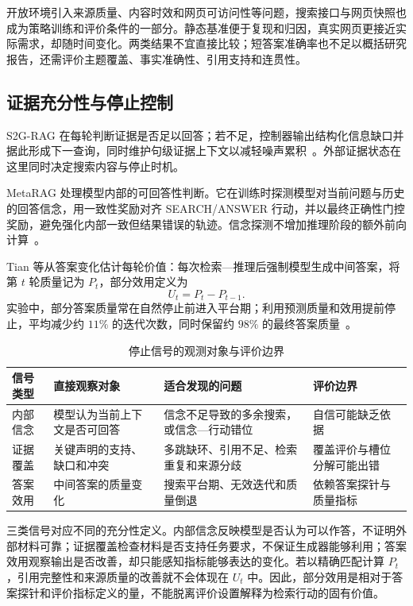 开放环境引入来源质量、内容时效和网页可访问性等问题，搜索接口与网页快照也成为策略训练和评价条件的一部分。静态基准便于复现和归因，真实网页更接近实际需求，却随时间变化。两类结果不宜直接比较；短答案准确率也不足以概括研究报告，还需评价主题覆盖、事实准确性、引用支持和连贯性。

\subsection{证据充分性与停止控制}

S2G-RAG 在每轮判断证据是否足以回答；若不足，控制器输出结构化信息缺口并据此形成下一查询，同时维护句级证据上下文以减轻噪声累积~\citep{li2026s2g}。外部证据状态在这里同时决定搜索内容与停止时机。

MetaRAG 处理模型内部的可回答性判断。它在训练时探测模型对当前问题与历史的回答信念，用一致性奖励对齐 SEARCH/ANSWER 行动，并以最终正确性门控奖励，避免强化内部一致但结果错误的轨迹。信念探测不增加推理阶段的额外前向计算~\citep{qi2026metarag}。

Tian 等从答案变化估计每轮价值：每次检索—推理后强制模型生成中间答案，将第 $t$ 轮质量记为 $P_t$，部分效用定义为
\begin{equation}
 U_t=P_t-P_{t-1}.
 \label{eq:partial-utility}
\end{equation}
实验中，部分答案质量常在自然停止前进入平台期；利用预测质量和效用提前停止，平均减少约 $11\%$ 的迭代次数，同时保留约 $98\%$ 的最终答案质量~\citep{tian2026partial}。

\begin{table}[t]
\centering
\small
\caption{停止信号的观测对象与评价边界}
\label{tab:signals}
\begin{tabularx}{\textwidth}{p{2.3cm}p{3.4cm}>{\raggedright\arraybackslash}XX}
\toprule
信号类型 & 直接观察对象 & 适合发现的问题 & 评价边界 \\
\midrule
内部信念 & 模型认为当前上下文是否可回答 & 信念不足导致的多余搜索，或信念—行动错位 & 自信可能缺乏依据 \\
证据覆盖 & 关键声明的支持、缺口和冲突 & 多跳缺环、引用不足、检索重复和来源分歧 & 覆盖评价与槽位分解可能出错 \\
答案效用 & 中间答案的质量变化 & 搜索平台期、无效迭代和质量倒退 & 依赖答案探针与质量指标 \\
\bottomrule
\end{tabularx}
\end{table}

三类信号对应不同的充分性定义。内部信念反映模型是否认为可以作答，不证明外部材料可靠；证据覆盖检查材料是否支持任务要求，不保证生成器能够利用；答案效用观察输出是否改善，却只能感知指标能够表达的变化。若以精确匹配计算 $P_t$，引用完整性和来源质量的改善就不会体现在 $U_t$ 中。因此，部分效用是相对于答案探针和评价指标定义的量，不能脱离评价设置解释为检索行动的固有价值。

